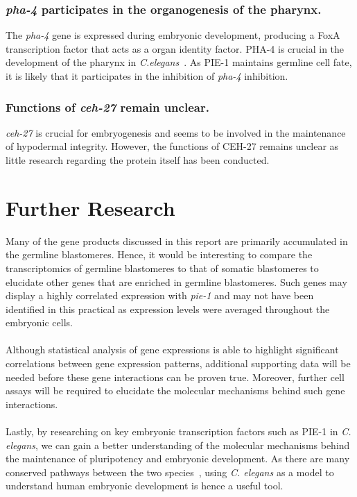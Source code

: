 \documentclass[11pt]{article}
\begin{document}
\subsubsection{\textit{pha-4} participates in the organogenesis of the pharynx.}
The \textit{pha-4} gene is expressed during embryonic development, producing a FoxA transcription factor that acts as a organ identity factor. PHA-4 is crucial in the development of the pharynx in \textit{C.elegans}~\citep{Mango1994}. As PIE-1 maintains germline cell fate, it is likely that it participates in the inhibition of \textit{pha-4} inhibition.

\subsubsection{Functions of \textit{ceh-27} remain unclear.}
\textit{ceh-27} is crucial for embryogenesis and seems to be involved in the maintenance of hypodermal integrity. However, the functions of CEH-27 remains unclear as little research regarding the protein itself has been conducted.

\section{Further Research}
Many of the gene products discussed in this report are primarily accumulated in the germline blastomeres. Hence, it would be interesting to compare the transcriptomics of germline blastomeres to that of somatic blastomeres to elucidate other genes that are enriched in germline blastomeres. Such genes may display a highly correlated expression with \textit{pie-1}  and may not have been identified in this practical as expression levels were averaged throughout the embryonic cells. 
\\
\\
Although statistical analysis of gene expressions is able to highlight significant correlations between gene expression patterns, additional supporting data will be needed before these gene interactions can be proven true. Moreover, further cell assays will be required to elucidate the molecular mechanisms behind such gene interactions. 
\\
\\
Lastly, by researching on key embryonic transcription factors such as PIE-1 in \textit{C. elegans}, we can gain a better understanding of the molecular mechanisms behind the maintenance of pluripotency and embryonic development. As there are many conserved pathways between the two species~\citep{Kaletta2006}, using \textit{C. elegans} as a model to understand human embryonic development is hence a useful tool.


\newpage


\end{document}
